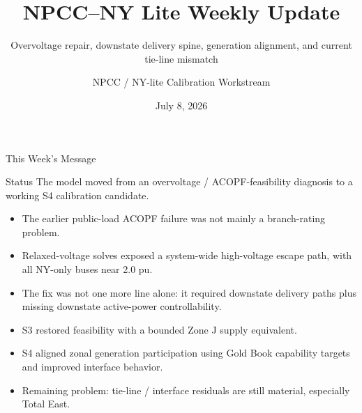 \documentclass[aspectratio=169,10pt]{beamer}
\title[NPCC--NY Weekly Update]{NPCC--NY Lite Weekly Update}
\subtitle{Overvoltage repair, downstate delivery spine, generation alignment, and current tie-line mismatch}
\author{NPCC / NY-lite Calibration Workstream}
\date{July 8, 2026}
\newcommand{\bad}[1]{\textcolor{alertred}{#1}}
\newcommand{\warn}[1]{\textcolor{warmgold}{#1}}
\begin{document}
\begin{frame}
  \titlepage
\end{frame}

\begin{frame}{This Week's Message}
\begin{block}{Status}
The model moved from an overvoltage / ACOPF-feasibility diagnosis to a working S4 calibration candidate.
\end{block}

\begin{itemize}
  \item The earlier public-load ACOPF failure was not mainly a branch-rating problem.
  \item Relaxed-voltage solves exposed a \bad{system-wide high-voltage escape path}, with all NY-only buses near 2.0 pu.
  \item The fix was not one more line alone: it required downstate delivery paths plus missing downstate active-power controllability.
  \item S3 restored feasibility with a bounded Zone J supply equivalent.
  \item S4 aligned zonal generation participation using Gold Book capability targets and improved interface behavior.
  \item Remaining problem: \warn{tie-line / interface residuals are still material}, especially Total East.
\end{itemize}
\end{frame}
\end{document}

